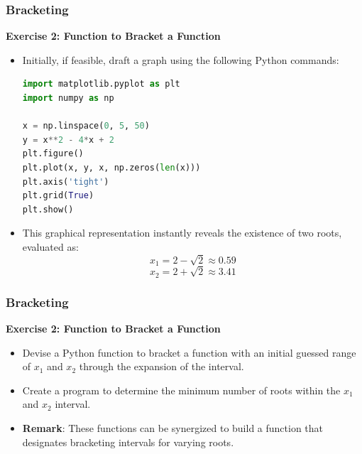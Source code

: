   \begin{frame}[fragile]
    \frametitle{Bracketing}
  
    \textbf{Exercise 2: Function to Bracket a Function}
    
    \begin{itemize}
      \item Initially, if feasible, draft a graph using the following Python commands:
        \begin{lstlisting}[language=Python]
import matplotlib.pyplot as plt
import numpy as np

x = np.linspace(0, 5, 50)
y = x**2 - 4*x + 2
plt.figure()
plt.plot(x, y, x, np.zeros(len(x)))
plt.axis('tight')
plt.grid(True)
plt.show()
        \end{lstlisting}
      \item This graphical representation instantly reveals the existence of two roots, evaluated as:
        \[
        x_1 = 2 - \sqrt{2} \approx 0.59
        \]
        \[
        x_2 = 2 + \sqrt{2} \approx 3.41
        \]
    \end{itemize}
  
  \end{frame}
  
  \begin{frame}[fragile]
    \frametitle{Bracketing}
  
    \textbf{Exercise 2: Function to Bracket a Function}
    \begin{itemize}
      \item Devise a Python function to bracket a function with an initial guessed range of \( x_1 \) and \( x_2 \) through the expansion of the interval.
      \item Create a program to determine the minimum number of roots within the \( x_1 \) and \( x_2 \) interval.
      \item \textbf{Remark}: These functions can be synergized to build a function that designates bracketing intervals for varying roots.
    \end{itemize}
  \end{frame}
  
